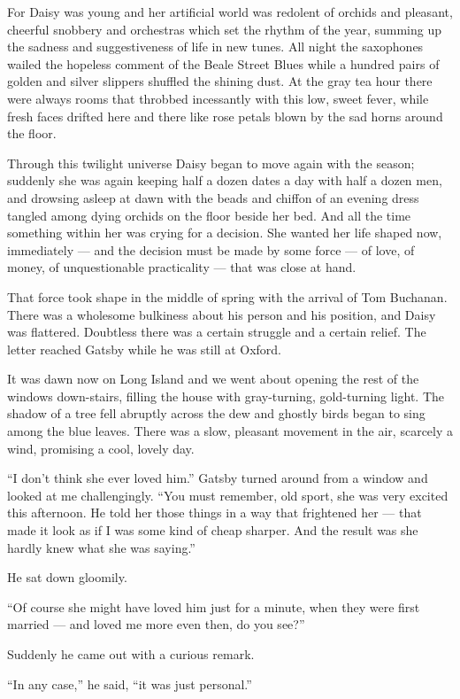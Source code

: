 \documentclass{znotebook}
\begin{document}
For Daisy was young and her artificial world was redolent of orchids and pleasant, cheerful snobbery and orchestras which set the rhythm of the year, summing up the sadness and suggestiveness of life in new tunes. All night the saxophones wailed the hopeless comment of the Beale Street Blues while a hundred pairs of golden and silver slippers shuffled the shining dust. At the gray tea hour there were always rooms that throbbed incessantly with this low, sweet fever, while fresh faces drifted here and there like rose petals blown by the sad horns around the floor.

Through this twilight universe Daisy began to move again with the season; suddenly she was again keeping half a dozen dates a day with half a dozen men, and drowsing asleep at dawn with the beads and chiffon of an evening dress tangled among dying orchids on the floor beside her bed. And all the time something within her was crying for a decision. She wanted her life shaped now, immediately — and the decision must be made by some force — of love, of money, of unquestionable practicality — that was close at hand.

That force took shape in the middle of spring with the arrival of Tom Buchanan. There was a wholesome bulkiness about his person and his position, and Daisy was flattered. Doubtless there was a certain struggle and a certain relief. The letter reached Gatsby while he was still at Oxford.

It was dawn now on Long Island and we went about opening the rest of the windows down-stairs, filling the house with gray-turning, gold-turning light. The shadow of a tree fell abruptly across the dew and ghostly birds began to sing among the blue leaves. There was a slow, pleasant movement in the air, scarcely a wind, promising a cool, lovely day.

``I don’t think she ever loved him.'' Gatsby turned around from a window and looked at me challengingly. ``You must remember, old sport, she was very excited this afternoon. He told her those things in a way that frightened her — that made it look as if I was some kind of cheap sharper. And the result was she hardly knew what she was saying.''

He sat down gloomily.

``Of course she might have loved him just for a minute, when they were first married — and loved me more even then, do you see?''

Suddenly he came out with a curious remark.

``In any case,'' he said, ``it was just personal.''
\end{document}
